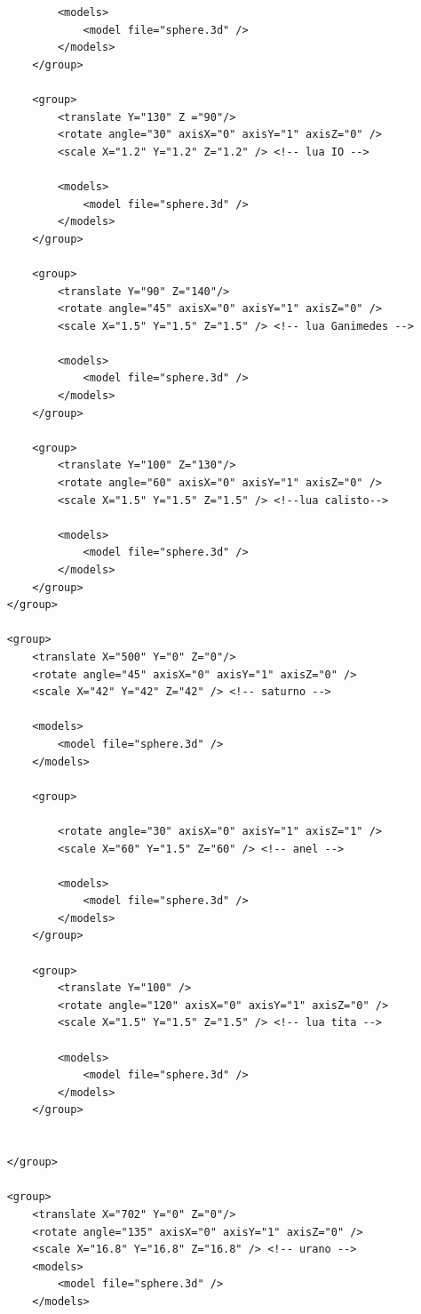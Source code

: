 \documentclass{report}
\begin{document}
\begin{lstlisting}
            <models>
                <model file="sphere.3d" />
            </models>
        </group>

        <group>
            <translate Y="130" Z ="90"/> 
            <rotate angle="30" axisX="0" axisY="1" axisZ="0" />
            <scale X="1.2" Y="1.2" Z="1.2" /> <!-- lua IO -->

            <models>
                <model file="sphere.3d" />
            </models>
        </group>

        <group>
            <translate Y="90" Z="140"/> 
            <rotate angle="45" axisX="0" axisY="1" axisZ="0" />
            <scale X="1.5" Y="1.5" Z="1.5" /> <!-- lua Ganimedes -->

            <models>
                <model file="sphere.3d" />
            </models>
        </group>

        <group>
            <translate Y="100" Z="130"/> 
            <rotate angle="60" axisX="0" axisY="1" axisZ="0" />
            <scale X="1.5" Y="1.5" Z="1.5" /> <!--lua calisto-->

            <models>
                <model file="sphere.3d" />
            </models>
        </group>
    </group>

    <group>
        <translate X="500" Y="0" Z="0"/> 
        <rotate angle="45" axisX="0" axisY="1" axisZ="0" />
        <scale X="42" Y="42" Z="42" /> <!-- saturno -->

        <models>
            <model file="sphere.3d" />
        </models>

        <group>
            
            <rotate angle="30" axisX="0" axisY="1" axisZ="1" />
            <scale X="60" Y="1.5" Z="60" /> <!-- anel -->

            <models>
                <model file="sphere.3d" />
            </models>
        </group>

        <group>
            <translate Y="100" /> 
            <rotate angle="120" axisX="0" axisY="1" axisZ="0" />
            <scale X="1.5" Y="1.5" Z="1.5" /> <!-- lua tita -->

            <models>
                <model file="sphere.3d" />
            </models>
        </group>


    </group>

    <group>
        <translate X="702" Y="0" Z="0"/> 
        <rotate angle="135" axisX="0" axisY="1" axisZ="0" />
        <scale X="16.8" Y="16.8" Z="16.8" /> <!-- urano -->
        <models>                        
            <model file="sphere.3d" />
        </models>
        

\end{lstlisting}
\end{document}
